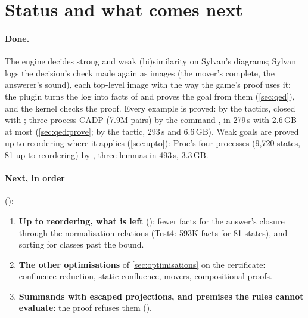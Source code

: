 \section{Status and what comes next}\label{sec:status}

\paragraph{Done.} The engine decides strong and weak (bi)similarity on
Sylvan's diagrams; Sylvan logs the decision's check made again as images
(the mover's complete, the answerer's sound), each top-level image with
the way the game's proof uses it; the plugin turns the log into facts of
 and proves the goal from them
(\cref{sec:qed}), and the kernel checks the proof. Every example is
proved: by the tactics, closed with ; three-process CADP (7.9M
pairs) by the command , in 279\,s with 2.6\,GB at most
(\cref{sec:qed:prove}; by the tactic, 293\,s and 6.6\,GB). Weak goals
are proved up to reordering where it applies (\cref{sec:upto}): Proc's
four processes (9,720 states, 81 up to reordering) by , three lemmas in 493\,s, 3.3\,GB.

\paragraph{Next, in order} ():
\begin{enumerate}
\item \textbf{Up to reordering, what is left} ():
  fewer facts for the answer's closure through the normalisation
  relations (Test4: 593K facts for 81 states), and sorting for classes
  past the bound.
\item \textbf{The other optimisations} of \cref{sec:optimisations} on the
  certificate: confluence reduction, static confluence, movers,
  compositional proofs.
\item \textbf{Summands with escaped projections, and premises the rules
  cannot evaluate}: the proof refuses them ().
\end{enumerate}

